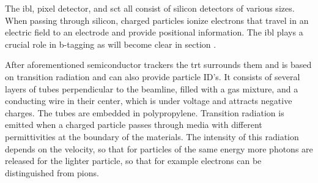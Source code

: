 The \ac{ibl}, pixel detector, and \ac{sct} all consist of silicon detectors of various sizes. When passing through silicon, charged particles ionize electrons that travel in an electric field to an electrode and provide positional information. The \ac{ibl} plays a crucial role in b-tagging as will become clear in section .

After aforementioned semiconductor trackers the \ac{trt} surrounds them and is based on transition radiation and can also provide particle ID's. It consists of several layers of tubes perpendicular to the beamline, filled with a gas mixture, and a conducting wire in their center, which is under voltage and attracts negative charges. The tubes are embedded in polypropylene. Transition radiation is emitted when a charged particle passes through media with different permittivities at the boundary of the materials. The intensity of this radiation depends on the velocity, so that for particles of the same energy more photons are released for the lighter particle, so that for example electrons can be distinguished from pions.

